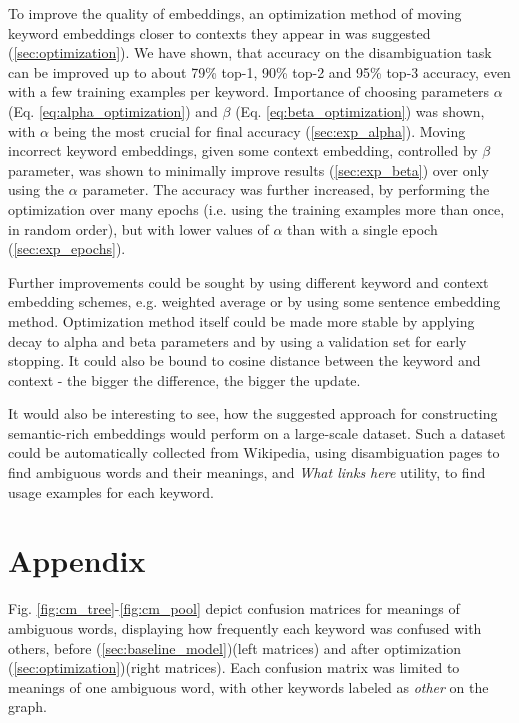 \documentclass{llncs}
\begin{document}
To improve the quality of embeddings, an optimization method of moving keyword embeddings closer to contexts they appear in was suggested (\ref{sec:optimization}).
We have shown, that accuracy on the disambiguation task can be improved up to about 79\% top-1, 90\% top-2 and 95\% top-3 accuracy, even with a few training examples per keyword.
Importance of choosing parameters \(\alpha\) (Eq. \ref{eq:alpha_optimization}) and \(\beta\) (Eq. \ref{eq:beta_optimization}) was shown, with \(\alpha\) being the most crucial for final accuracy (\ref{sec:exp_alpha}).
Moving incorrect keyword embeddings, given some context embedding, controlled by \(\beta\) parameter, was shown to  minimally improve results (\ref{sec:exp_beta}) over only using the \(\alpha\) parameter.
The accuracy was further increased, by performing the optimization over many epochs (i.e. using the training examples more than once, in random order), but with lower values of \(\alpha\) than with a single epoch (\ref{sec:exp_epochs}).

Further improvements could be sought by using different keyword and context embedding schemes, e.g. weighted average or by using some sentence embedding method. Optimization method itself could be made more stable by applying decay to alpha and beta parameters and by using a validation set for early stopping. It could also be bound to cosine distance between the keyword and context - the bigger the difference, the bigger the update.

It would also be interesting to see, how the suggested approach for constructing semantic-rich embeddings would perform on a large-scale dataset.
Such a dataset could be automatically collected from Wikipedia, using disambiguation pages to find ambiguous words and their meanings, and \textit{What links here} utility, to find usage examples for each keyword.




\newpage
\appendix
\section{Appendix}
\label{sec:appendix}

Fig. \ref{fig:cm_tree}-\ref{fig:cm_pool} depict confusion matrices for meanings of ambiguous words, displaying how frequently each keyword was confused with others, before (\ref{sec:baseline_model})(left matrices) and after optimization (\ref{sec:optimization})(right matrices).
Each confusion matrix was limited to meanings of one ambiguous word, with other keywords labeled as \textit{other} on the graph.
\end{document}
